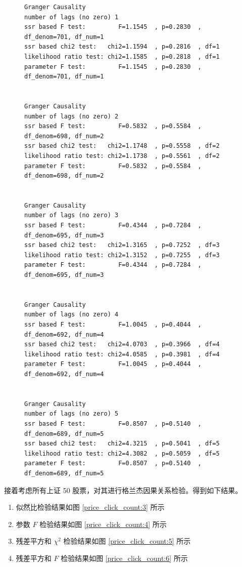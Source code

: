 \begin{figure}
  \begin{minipage}{\textwidth}
    \begin{lstlisting}[caption=浦发银行 (600000) 价格与讨论帖点击量检验结果, label=price_click_count:2]
Granger Causality
number of lags (no zero) 1
ssr based F test:         F=1.1545  , p=0.2830  , df_denom=701, df_num=1
ssr based chi2 test:   chi2=1.1594  , p=0.2816  , df=1
likelihood ratio test: chi2=1.1585  , p=0.2818  , df=1
parameter F test:         F=1.1545  , p=0.2830  , df_denom=701, df_num=1


Granger Causality
number of lags (no zero) 2
ssr based F test:         F=0.5832  , p=0.5584  , df_denom=698, df_num=2
ssr based chi2 test:   chi2=1.1748  , p=0.5558  , df=2
likelihood ratio test: chi2=1.1738  , p=0.5561  , df=2
parameter F test:         F=0.5832  , p=0.5584  , df_denom=698, df_num=2


Granger Causality
number of lags (no zero) 3
ssr based F test:         F=0.4344  , p=0.7284  , df_denom=695, df_num=3
ssr based chi2 test:   chi2=1.3165  , p=0.7252  , df=3
likelihood ratio test: chi2=1.3152  , p=0.7255  , df=3
parameter F test:         F=0.4344  , p=0.7284  , df_denom=695, df_num=3


Granger Causality
number of lags (no zero) 4
ssr based F test:         F=1.0045  , p=0.4044  , df_denom=692, df_num=4
ssr based chi2 test:   chi2=4.0703  , p=0.3966  , df=4
likelihood ratio test: chi2=4.0585  , p=0.3981  , df=4
parameter F test:         F=1.0045  , p=0.4044  , df_denom=692, df_num=4


Granger Causality
number of lags (no zero) 5
ssr based F test:         F=0.8507  , p=0.5140  , df_denom=689, df_num=5
ssr based chi2 test:   chi2=4.3215  , p=0.5041  , df=5
likelihood ratio test: chi2=4.3082  , p=0.5059  , df=5
parameter F test:         F=0.8507  , p=0.5140  , df_denom=689, df_num=5
    \end{lstlisting}
  \end{minipage}
\end{figure}

接着考虑所有上证 50 股票，对其进行格兰杰因果关系检验。得到如下结果。

\begin{enumerate}
  \item 似然比检验结果如图 \ref{price_click_count:3} 所示
  \item 参数 $F$ 检验结果如图 \ref{price_click_count:4} 所示
  \item 残差平方和 $\chi^{2}$ 检验结果如图 \ref{price_click_count:5} 所示
  \item 残差平方和 $F$ 检验结果如图 \ref{price_click_count:6} 所示
\end{enumerate}

